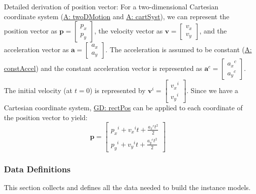 \documentclass[12pt]{article}
\begin{document}
Detailed derivation of position vector:
For a two-dimensional Cartesian coordinate system (\hyperref[twoDMotion]{A: twoDMotion} and \hyperref[cartSyst]{A: cartSyst}), we can represent the position vector as $\mathbf{p}=\begin{bmatrix}
{p_{x}}\\
{p_{y}}
\end{bmatrix}$, the velocity vector as $\mathbf{v}=\begin{bmatrix}
{v_{x}}\\
{v_{y}}
\end{bmatrix}$, and the acceleration vector as $\mathbf{a}=\begin{bmatrix}
{a_{x}}\\
{a_{y}}
\end{bmatrix}$. The acceleration is assumed to be constant (\hyperref[constAccel]{A: constAccel}) and the constant acceleration vector is represented as ${\mathbf{a}^{c}}=\begin{bmatrix}
{{a_{x}}^{c}}\\
{{a_{y}}^{c}}
\end{bmatrix}$. The initial velocity (at $t=0$) is represented by ${\mathbf{v}^{i}}=\begin{bmatrix}
{{v_{x}}^{i}}\\
{{v_{y}}^{i}}
\end{bmatrix}$. Since we have a Cartesian coordinate system, \hyperref[GD:rectPos]{GD: rectPos} can be applied to each coordinate of the position vector to yield:
\begin{displaymath}
\mathbf{p}=\begin{bmatrix}
{{p_{x}}^{i}}+{{v_{x}}^{i}} t+\frac{{{a_{x}}^{c}} t^{2}}{2}\\
{{p_{y}}^{i}}+{{v_{y}}^{i}} t+\frac{{{a_{y}}^{c}} t^{2}}{2}
\end{bmatrix}
\end{displaymath}
\subsubsection{Data Definitions}
\label{Sec:DDs}
This section collects and defines all the data needed to build the instance models.
\par~
\end{document}
